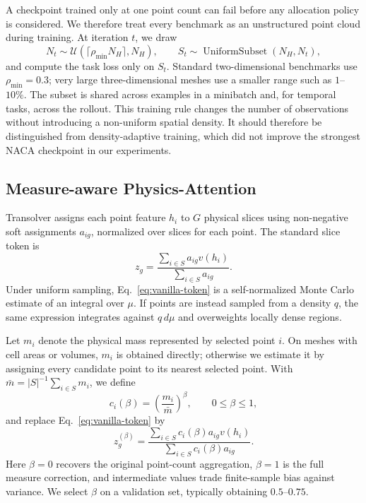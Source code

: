 \documentclass{article}
\begin{document}
A checkpoint trained only at one point count can fail before any allocation
policy is considered. We therefore treat every benchmark as an unstructured
point cloud during training. At iteration $t$, we draw
\begin{equation}
N_t \sim \mathcal{U}\!\left(\lceil\rho_{\min}N_H\rceil,N_H\right),
\qquad
S_t \sim \operatorname{UniformSubset}(N_H,N_t),
\end{equation}
and compute the task loss only on $S_t$. Standard two-dimensional benchmarks
use $\rho_{\min}=0.3$; very large three-dimensional meshes use a smaller range
such as $1$--$10\%$. The subset is shared across examples in a minibatch and,
for temporal tasks, across the rollout. This training rule changes the number
of observations without introducing a non-uniform spatial density. It should
therefore be distinguished from density-adaptive training, which did not
improve the strongest NACA checkpoint in our experiments.

\subsection{Measure-aware Physics-Attention}

Transolver assigns each point feature $h_i$ to $G$ physical slices using
non-negative soft assignments $a_{ig}$, normalized over slices for each point.
The standard slice token is
\begin{equation}
z_g = \frac{\sum_{i\in S} a_{ig}v(h_i)}
           {\sum_{i\in S} a_{ig}}.
\label{eq:vanilla-token}
\end{equation}
Under uniform sampling, Eq.~\eqref{eq:vanilla-token} is a self-normalized Monte
Carlo estimate of an integral over $\mu$. If points are instead sampled from a
density $q$, the same expression integrates against $q\,d\mu$ and overweights
locally dense regions.

Let $m_i$ denote the physical mass represented by selected point $i$. On meshes
with cell areas or volumes, $m_i$ is obtained directly; otherwise we estimate it
by assigning every candidate point to its nearest selected point. With
$\bar m=|S|^{-1}\sum_{i\in S}m_i$, we define
\begin{equation}
c_i(\beta)=\left(\frac{m_i}{\bar m}\right)^\beta,
\qquad 0\leq\beta\leq1,
\end{equation}
and replace Eq.~\eqref{eq:vanilla-token} by
\begin{equation}
z_g^{(\beta)} =
\frac{\sum_{i\in S} c_i(\beta)a_{ig}v(h_i)}
     {\sum_{i\in S} c_i(\beta)a_{ig}}.
\label{eq:measure-token}
\end{equation}
Here $\beta=0$ recovers the original point-count aggregation, $\beta=1$ is the
full measure correction, and intermediate values trade finite-sample bias
against variance. We select $\beta$ on a validation set, typically obtaining
$0.5$--$0.75$.
\end{document}
